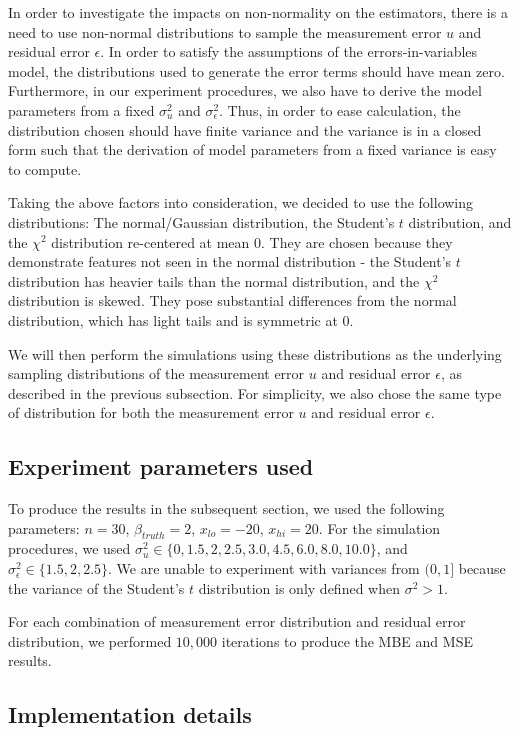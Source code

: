 \documentclass{article}
\begin{document}
In order to investigate the impacts on non-normality on the estimators, there is a need to use non-normal distributions to sample the measurement error $u$ and residual error $\epsilon$.
In order to satisfy the assumptions of the errors-in-variables model, the distributions used to generate the error terms should have mean zero.
Furthermore, in our experiment procedures, we also have to derive the model parameters from a fixed $\sigma_u^2$ and $\sigma_\epsilon^2$.
Thus, in order to ease calculation, the distribution chosen should have finite variance and the variance is in a closed form such that the derivation of model parameters from a fixed variance is easy to compute.

Taking the above factors into consideration, we decided to use the following distributions: The normal/Gaussian distribution, the Student's $t$ distribution, and the $\chi^2$ distribution re-centered at mean $0$.
They are chosen because they demonstrate features not seen in the normal distribution - the Student's $t$ distribution has heavier tails than the normal distribution, and the $\chi^2$ distribution is skewed.
They pose substantial differences from the normal distribution, which has light tails and is symmetric at $0$.

We will then perform the simulations using these distributions as the underlying sampling distributions of the measurement error $u$ and residual error $\epsilon$, as described in the previous subsection.
For simplicity, we also chose the same type of distribution for both the measurement error $u$ and residual error $\epsilon$.

\subsection{Experiment parameters used}

To produce the results in the subsequent section, we used the following parameters: $n=30$, $\beta_{truth}=2$, $x_{lo} = -20$, $x_{hi} = 20$.
For the simulation procedures, we used $\sigma^2_u \in \{0, 1.5, 2, 2.5, 3.0, 4.5, 6.0, 8.0, 10.0\}$, and $\sigma_\epsilon^2 \in \{1.5, 2, 2.5\}$.
We are unable to experiment with variances from $(0, 1]$ because the variance of the Student's $t$ distribution is only defined when $\sigma^2 > 1$.

For each combination of measurement error distribution and residual error distribution, we performed $10,000$ iterations to produce the MBE and MSE results.

\subsection{Implementation details}
\end{document}
